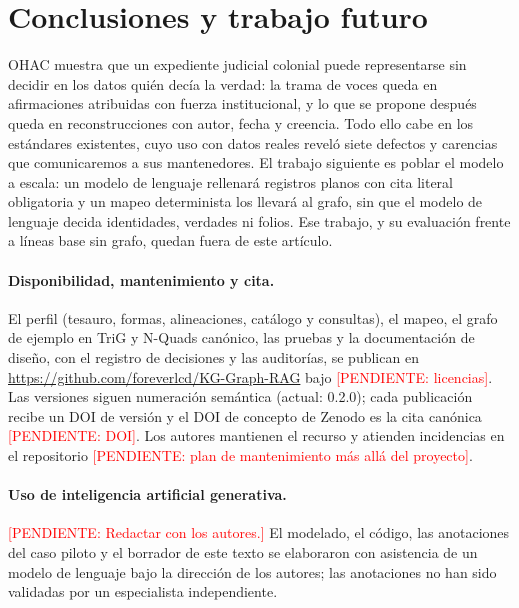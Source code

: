 \documentclass[runningheads]{llncs}
\newcommand{\pendiente}[1]{\textcolor{red}{[PENDIENTE: #1]}}
\begin{document}
\section{Conclusiones y trabajo futuro}\label{sec:conclusiones}

OHAC muestra que un expediente judicial colonial puede representarse sin decidir en los datos quién decía la verdad:
la trama de voces queda en afirmaciones atribuidas con fuerza institucional, y lo que se propone después queda en
reconstrucciones con autor, fecha y creencia. Todo ello cabe en los estándares existentes, cuyo uso con datos reales
reveló siete defectos y carencias que comunicaremos a sus mantenedores. El trabajo siguiente es poblar el modelo a
escala: un modelo de lenguaje rellenará registros planos con cita literal obligatoria y un mapeo determinista los
llevará al grafo, sin que el modelo de lenguaje decida identidades, verdades ni folios. Ese trabajo, y su evaluación
frente a líneas base sin grafo, quedan fuera de este artículo.

\paragraph{Disponibilidad, mantenimiento y cita.}
El perfil (tesauro, formas, alineaciones, catálogo y consultas), el mapeo, el grafo de ejemplo en TriG y N-Quads
canónico, las pruebas y la documentación de diseño, con el registro de decisiones y las auditorías, se publican en
\url{https://github.com/foreverlcd/KG-Graph-RAG} bajo \pendiente{licencias}. Las versiones siguen numeración semántica (actual: 0.2.0); cada
publicación recibe un DOI de versión y el DOI de concepto de Zenodo es la cita canónica \pendiente{DOI}. Los autores
mantienen el recurso y atienden incidencias en el repositorio \pendiente{plan de mantenimiento más allá del proyecto}.

\paragraph{Uso de inteligencia artificial generativa.}
\pendiente{Redactar con los autores.} El modelado, el código, las anotaciones del caso piloto y el borrador de este
texto se elaboraron con asistencia de un modelo de lenguaje bajo la dirección de los autores; las anotaciones no han
sido validadas por un especialista independiente.



\end{document}
